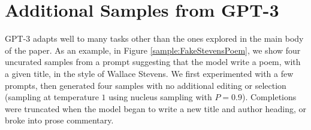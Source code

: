 \documentclass{article}
\begin{document}
\section{Additional Samples from GPT-3}
\label{appendix:additional_samples}
GPT-3 adapts well to many tasks other than the ones explored in the main body of the paper.  As an example, in Figure \ref{sample:FakeStevensPoem}, we show four uncurated samples from a prompt suggesting that the model write a poem, with a given title, in the style of Wallace Stevens.  We first experimented with a few prompts, then generated four  samples with no additional editing or selection (sampling at temperature $1$ using nucleus sampling \cite{DBLP:journals/corr/abs-1904-09751} with $P=0.9$). Completions  were truncated when the model began to write a new title and author heading, or broke into prose commentary.
\end{document}

